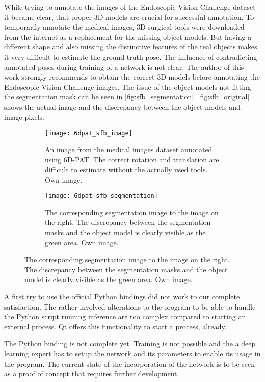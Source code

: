 While trying to annotate the images of the Endoscopic Vision Challenge dataset it became clear, that proper 3D models are crucial for successful annotation. To temporarily annotate the medical images, 3D surgical tools were downloaded from the internet as a replacement for the missing object models. But having a different shape and also missing the distinctive features of the real objects makes it very difficult to estimate the ground-truth pose. The influence of contradicting annotated poses during training of a network is not clear. The author of this work strongly recommends to obtain the correct 3D models before annotating the Endoscopic Vision Challenge images. The issue of the object models not fitting the segmentation mask can be seen in \fig \ref{fig:sfb_segmentation}. \fig \ref{fig:sfb_original} shows the actual image and the discrepancy between the object models and image pixels.

\begin{figure}[!tbp]
	\begin{subfigure}[t]{0.47\textwidth}
		\centering
    	\texttt{[image: 6dpat\_sfb\_image]}
    	\caption{An image from the medical images dataset annotated using 6D-PAT. The correct rotation and translation are difficult to estimate without the actually used tools. Own image.}
    	\label{fig:6dpat_sfb_image}
	\end{subfigure} 
	\hfill
	\begin{subfigure}[t]{0.47\textwidth}
		\centering
    	\texttt{[image: 6dpat\_sfb\_segmentation]}
    	\caption{The corresponding segmentation image to the image on the right. The discrepancy between the segmentation masks and the object model is clearly visible as the green area. Own image.}
    	\label{fig:6dpat_sfb_segmentation}
	\end{subfigure} 
\end{figure} 

A first try to use the official Python bindings did not work to our complete satisfaction. The rather involved alterations to the program to be able to handle the Python script running inference are too complex compared to starting an external process. Qt offers this functionality to start a process, already.

The Python binding is not complete yet. Training is not possible and the a deep learning expert has to setup the network and its parameters to enable its usage in the program. The current state of the incorporation of the network is to be seen as a proof of concept that requires further development.

